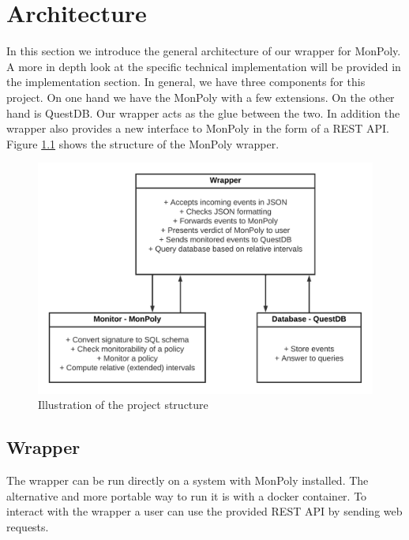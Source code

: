 \chapter{Architecture}

In this section we introduce the general architecture of our wrapper for MonPoly.
A more in depth look at the specific technical implementation will be provided in the implementation section.
In general, we have three components for this project.
On one hand we have the MonPoly with a few extensions.
On the other hand is QuestDB.
Our wrapper acts as the glue between the two.
In addition the wrapper also provides a new interface to MonPoly in the form of a REST API.
Figure \ref{fig:wrapper} shows the structure of the MonPoly wrapper.

\begin{center}
\begin{figure}
  \includegraphics[width=140mm]{diagrams/wrapper.png}
  \caption{Illustration of the project structure}
  \label{fig:wrapper}
\end{figure}

\end{center}



\section{Wrapper}

The wrapper can be run directly on a system with MonPoly installed.
The alternative and more portable way to run it is with a docker container.
To interact with the wrapper a user can use the provided REST API by sending web requests.

